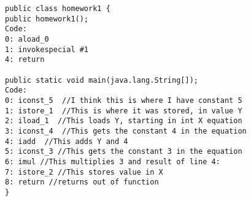 \documentclass[12pt]{article}
\begin{document}
\begin{lstlisting}[caption = Return of \textit{javap -c homework1.java} with notes]
public class homework1 {
public homework1();
Code:
0: aload_0
1: invokespecial #1                  
4: return

public static void main(java.lang.String[]);
Code:
0: iconst_5	 //I think this is where I have constant 5
1: istore_1  //This is where it was stored, in value Y
2: iload_1  //This loads Y, starting in int X equation
3: iconst_4  //This gets the constant 4 in the equation
4: iadd  //This adds Y and 4
5: iconst_3 //This gets the constant 3 in the equation
6: imul //This multiplies 3 and result of line 4:
7: istore_2 //This stores value in X
8: return //returns out of function
}
\end{lstlisting}
\end{document}
